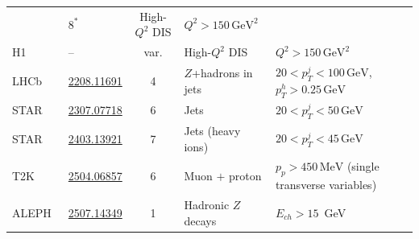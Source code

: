 \begin{table}
{\begin{tabular}{@{} l l c l l @{}}
      & $8^{*}$
      & High-$Q^{2}$ DIS
      & $Q^{2} > 150\,\text{GeV}^{2}$ \\
    H1~\cite{H1:prelim}
      & --
      & var.
      & High-$Q^{2}$ DIS
      & $Q^{2} > 150\,\text{GeV}^{2}$ \\
    LHCb~\cite{LHCb:2022rky}
      & \href{https://arxiv.org/abs/2208.11691}{2208.11691}
      & 4
      & $Z$+hadrons in jets
      & $20 < p_{T}^{j} < 100\,\text{GeV}$, $p_{T}^{h} > 0.25\,\text{GeV}$ \\
    STAR~\cite{Song:2023sxb}
      & \href{https://arxiv.org/abs/2307.07718}{2307.07718}
      & 6
      & Jets
      & $20 < p_{T}^{j} < 50\,\text{GeV}$ \\
    STAR~\cite{Pani:2024mgy}
      & \href{https://arxiv.org/abs/2403.13921}{2403.13921}
      & 7
      & Jets (heavy ions)
      & $20 < p_{T}^{j} < 45\,\text{GeV}$ \\
    T2K~\cite{Huang:2025ziq}
      & \href{https://arxiv.org/abs/2504.06857}{2504.06857}
      & 6
      & Muon $+$ proton
      & $p_{p} > 450\,\text{MeV}$ (single transverse variables) \\
    \midrule
    ALEPH~\cite{Electron-PositronAlliance:2025nbl}
      & \href{https://arxiv.org/abs/2507.14349}{2507.14349}
      & 1
      & Hadronic $Z$ decays
      & $E_{ch} > 15$~GeV  \\
    \bottomrule
  \end{tabular}%
  }
\end{table}
